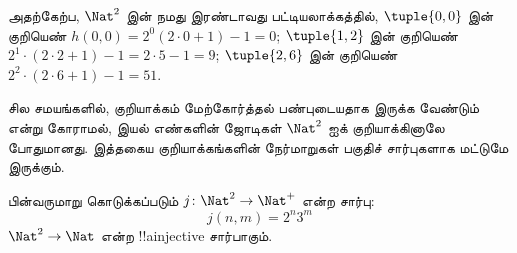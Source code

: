 \documentclass[../../../include/open-logic-section]{subfiles}
\begin{document}
\begin{explain}
அதற்கேற்ப, $\Nat^2$ இன் நமது இரண்டாவது பட்டியலாக்கத்தில்,
$\tuple{0,0}$ இன் குறியெண் $h(0,0) = 2^0(2\cdot 0+1) - 1 = 0$;
$\tuple{1,2}$ இன் குறியெண் $2^{1} \cdot (2 \cdot 2 + 1) - 1 = 2
\cdot 5 - 1 = 9$;
$\tuple{2,6}$ இன் குறியெண் $2^{2} \cdot (2
\cdot 6 + 1) - 1 = 51$.
\end{explain}

சில சமயங்களில், குறியாக்கம் மேற்கோர்த்தல் பண்புடையதாக இருக்க வேண்டும்
என்று கோராமல், இயல் எண்களின் ஜோடிகள் $\Nat^2$ ஐக்
குறியாக்கினாலே போதுமானது.
இத்தகைய குறியாக்கங்களின் நேர்மாறுகள் பகுதிச் சார்புகளாக மட்டுமே இருக்கும்.

\begin{ex}
பின்வருமாறு கொடுக்கப்படும் $j\colon \Nat^2 \to \Nat^+$ என்ற சார்பு:
\[
j(n,m) = 2^n3^m
\]
$\Nat^2 \to \Nat$ என்ற !!a{injective} சார்பாகும்.
\end{ex}
\end{document}
